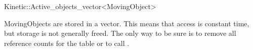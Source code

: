 

\begin{ccRefClass}{Kinetic::Active_objects_vector<MovingObject>}  %


\ccDefinition
  

MovingObjects are stored in a vector. This means that access is constant
time, but storage is not generally freed. The only way to be sure is
to remove all reference counts for the table or to call .



\ccIsModel





\end{ccRefClass}


